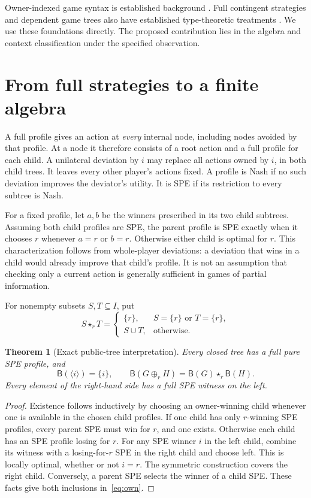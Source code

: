 \documentclass[11pt]{article}
\newtheorem{theorem}{Theorem}[section]
\newcommand{\at}[1]{\langle #1\rangle}
\newcommand{\ch}[1]{\mathbin{\oplus_{#1}}}
\newcommand{\ow}[1]{\mathbin{\star_{#1}}}
\newcommand{\B}{\mathsf B}
\begin{document}
Owner-indexed game syntax is established background
\cite{Abramsky2007,OldeLoohuisVenema2010}. Full contingent strategies and
dependent game trees also have established type-theoretic treatments
\cite{EscardoOliva2023}. We use these foundations directly. The proposed
contribution lies in the algebra and context classification under the
specified observation.

\section{From full strategies to a finite algebra}

A full profile gives an action at \emph{every} internal node, including
nodes avoided by that profile. At a node it therefore consists of a root
action and a full profile for each child. A unilateral deviation by $i$
may replace all actions owned by $i$, in both child trees. It leaves every
other player's actions fixed. A profile is Nash if no such deviation
improves the deviator's utility. It is SPE if its restriction to every
subtree is Nash.

For a fixed profile, let $a,b$ be the winners prescribed in its two child
subtrees. Assuming both child profiles are SPE, the parent profile is SPE
exactly when it chooses $r$ whenever $a=r$ or $b=r$. Otherwise either
child is optimal for $r$. This characterization follows from whole-player
deviations: a deviation that wins in a child would already improve that
child's profile. It is not an assumption that checking only a current
action is generally sufficient in games of partial information.

For nonempty subsets $S,T\subseteq I$, put
\begin{equation}\label{eq:own}
 S\ow r T =
 \begin{cases}
 \{r\},&S=\{r\}\text{ or }T=\{r\},\\
 S\cup T,&\text{otherwise}.
 \end{cases}
\end{equation}

\begin{theorem}[Exact public-tree interpretation]\label{thm:adequacy}
Every closed tree has a full pure SPE profile, and
\[
 \B(\at i)=\{i\},\qquad
 \B(G\ch r H)=\B(G)\ow r\B(H).
\]
Every element of the right-hand side has a full SPE witness on the left.
\end{theorem}
\begin{proof}
Existence follows inductively by choosing an owner-winning child whenever
one is available in the chosen child profiles. If one child has only
$r$-winning SPE profiles, every parent SPE must win for $r$, and one
exists. Otherwise each child has an SPE profile losing for $r$. For any
SPE winner $i$ in the left child, combine its witness with a losing-for-$r$
SPE in the right child and choose left. This is locally optimal, whether
or not $i=r$. The symmetric construction covers the right child.
Conversely, a parent SPE selects the winner of a child SPE. These facts
give both inclusions in~\eqref{eq:own}.
\end{proof}
\end{document}
